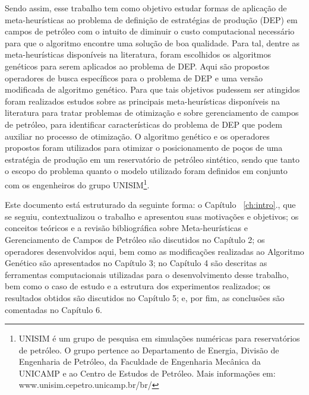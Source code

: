 Sendo assim, esse trabalho tem como objetivo estudar formas de aplicação de meta-heurísticas ao problema de definição de estratégias de produção (DEP) em campos de petróleo com o intuito de diminuir o custo computacional necessário para que o algoritmo encontre uma solução de boa qualidade. Para tal, dentre as meta-heurísticas disponíveis na literatura, foram escolhidos os algoritmos genéticos para serem aplicados ao problema de DEP. Aqui são propostos operadores de busca específicos para o problema de DEP e uma versão modificada de algoritmo genético. Para que tais objetivos pudessem ser atingidos foram realizados estudos sobre as principais meta-heurísticas disponíveis na literatura para tratar problemas de otimização e sobre gerenciamento de campos de petróleo, para identificar características do problema de DEP que podem auxiliar no processo de otimização. O algoritmo genético e os operadores propostos foram utilizados para otimizar o posicionamento de poços de uma estratégia de produção em um reservatório de petróleo sintético, sendo que tanto o escopo do problema quanto o modelo utilizado foram definidos em conjunto com os engenheiros do grupo UNISIM\footnote{UNISIM é um grupo de pesquisa em simulações numéricas para reservatórios de petróleo. O grupo pertence ao Departamento de Energia, Divisão de Engenharia de Petróleo, da Faculdade de Engenharia Mecânica da UNICAMP e ao Centro de Estudos de Petróleo. Mais informações em: www.unisim.cepetro.unicamp.br/br/}.

Este documento está estruturado da seguinte forma: o Capítulo ~\ref{ch:intro}., que se seguiu, contextualizou o trabalho e apresentou suas motivações e objetivos; os conceitos teóricos e a revisão bibliográfica sobre Meta-heurísticas e Gerenciamento de Campos de Petróleo são discutidos no Capítulo 2; os operadores desenvolvidos aqui, bem como as modificações realizadas ao Algoritmo Genético são apresentados no Capítulo 3; no Capítulo 4 são descritas as ferramentas computacionais utilizadas para o desenvolvimento desse trabalho, bem como o caso de estudo e a estrutura dos experimentos realizados; os resultados obtidos são discutidos no Capítulo 5; e, por fim, as conclusões são comentadas no Capítulo 6.